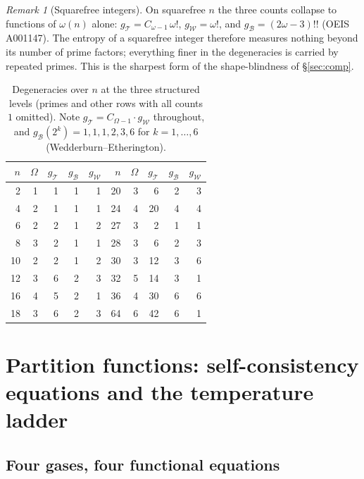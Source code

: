 \documentclass[11pt]{article}
\newcommand{\cT}{\mathcal{T}}   %
\newcommand{\cW}{\mathcal{W}}   %
\newcommand{\cB}{\mathcal{B}}   %
\numberwithin{equation}{section}
\theoremstyle{plain}
\theoremstyle{definition}
\theoremstyle{remark}
\newtheorem{remark}[theorem]{Remark}
\begin{document}
\begin{remark}[Squarefree integers]\label{rem:squarefree}
On squarefree $n$ the three counts collapse to functions of $\omega(n)$ alone:
$g_\cT = C_{\omega-1}\,\omega!$, $g_\cW = \omega!$, and $g_\cB = (2\omega-3)!!$
(OEIS A001147). The entropy of a squarefree integer therefore measures nothing
beyond its number of prime factors; everything finer in the degeneracies is
carried by repeated primes. This is the sharpest form of the shape-blindness of
\S\ref{sec:comp}.
\end{remark}

\begin{table}[ht]
\centering\small
\begin{tabular}{@{}rrrrr@{\hspace{9mm}}rrrrr@{}}
\toprule
$n$ & $\Omega$ & $g_\cT$ & $g_\cB$ & $g_\cW$ &
$n$ & $\Omega$ & $g_\cT$ & $g_\cB$ & $g_\cW$ \\
\midrule
 2 & 1 &  1 & 1 & 1 &  20 & 3 &  6 & 2 & 3 \\
 4 & 2 &  1 & 1 & 1 &  24 & 4 & 20 & 4 & 4 \\
 6 & 2 &  2 & 1 & 2 &  27 & 3 &  2 & 1 & 1 \\
 8 & 3 &  2 & 1 & 1 &  28 & 3 &  6 & 2 & 3 \\
10 & 2 &  2 & 1 & 2 &  30 & 3 & 12 & 3 & 6 \\
12 & 3 &  6 & 2 & 3 &  32 & 5 & 14 & 3 & 1 \\
16 & 4 &  5 & 2 & 1 &  36 & 4 & 30 & 6 & 6 \\
18 & 3 &  6 & 2 & 3 &  64 & 6 & 42 & 6 & 1 \\
\bottomrule
\end{tabular}
\caption{Degeneracies over $n$ at the three structured levels (primes and other rows
with all counts $1$ omitted). Note $g_\cT = C_{\Omega-1}\cdot g_\cW$ throughout, and
$g_\cB(2^k) = 1,1,1,2,3,6$ for $k=1,\dots,6$ (Wedderburn--Etherington).}
\label{tab:degeneracies}
\end{table}

\section{Partition functions: self-consistency equations and the temperature ladder}
\label{sec:zeta}

\subsection{Four gases, four functional equations}
\end{document}
